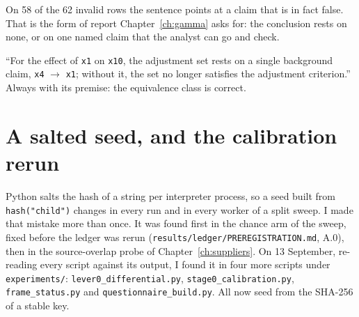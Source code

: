 On 58 of the 62 invalid rows the sentence points at a claim that is in fact false. That is the form of
report Chapter~\ref{ch:gamma} asks for: the conclusion rests on none, or on one named claim that the
analyst can go and check.

\begin{sonorio}
``For the effect of \texttt{x1} on \texttt{x10}, the adjustment set rests on a single background claim,
\texttt{x4} $\to$ \texttt{x1}; without it, the set no longer satisfies the adjustment criterion.'' Always
with its premise: the equivalence class is correct.
\end{sonorio}


\begin{antes}
\end{antes}

\section{A salted seed, and the calibration rerun}\label{sec:frame-seeds}

\begin{sloppypar}
Python salts the hash of a string per interpreter process, so a seed built from
\texttt{hash("child")} changes in every run and in every worker of a split sweep. I made that mistake
more than once. It was found first in the chance arm of the sweep, fixed before the ledger was rerun
(\texttt{results/ledger/PREREGISTRATION.md}, A.0), then in the source-overlap probe of
Chapter~\ref{ch:suppliers}. On 13 September, re-reading every script against its output, I found it in
four more scripts under \texttt{experiments/}: \texttt{lever0\_differential.py},
\texttt{stage0\_calibration.py}, \texttt{frame\_status.py} and \texttt{questionnaire\_build.py}. All now
seed from the SHA-256 of a stable key.
\end{sloppypar}

